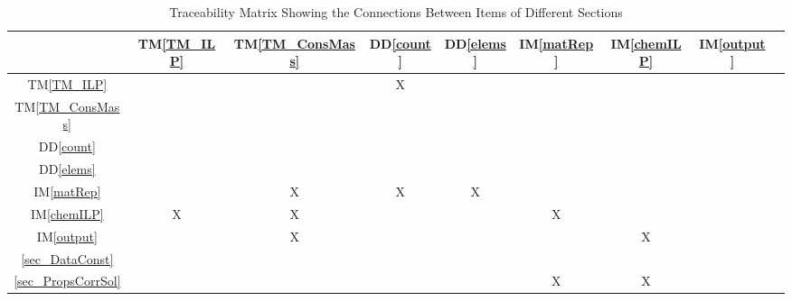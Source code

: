 \documentclass[12pt]{article}
\newcommand{\ddref}[1]{DD\ref{#1}}
\newcommand{\tmref}[1]{TM\ref{#1}}
\newcommand{\imref}[1]{IM\ref{#1}}
\begin{document}
\begin{table}[h!]
  \centering
  \begin{tabular}{|c|c|c|c|c|c|c|c|c|}
    \hline
                           & \tmref{TM_ILP} & \tmref{TM_ConsMass} & \ddref{count} & \ddref{elems} & \imref{matRep} & \imref{chemILP} & \imref{output} \\
    \hline
    \tmref{TM_ILP}         &                &                     & X             &               &                &                 &                \\ \hline
    \tmref{TM_ConsMass}    &                &                     &               &               &                &                 &                \\ \hline
    \ddref{count}          &                &                     &               &               &                &                 &                \\ \hline
    \ddref{elems}          &                &                     &               &               &                &                 &                \\ \hline
    \imref{matRep}         &                & X                   & X             & X             &                &                 &                \\ \hline
    \imref{chemILP}        & X              & X                   &               &               & X              &                 &                \\ \hline
    \imref{output}         &                & X                   &               &               &                & X               &                \\ \hline
    \ref{sec_DataConst}    &                &                     &               &               &                &                 &                \\ \hline
    \ref{sec_PropsCorrSol} &                &                     &               &               & X              & X               &                \\ \hline
  \end{tabular}
  \caption{Traceability Matrix Showing the Connections Between Items of Different Sections}
  \label{Table:srs_trace}
\end{table}
\end{document}
